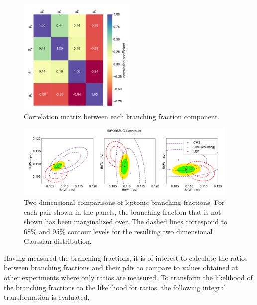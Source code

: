 \begin{figure}[htb!]
    \begin{center}
    \includegraphics[width=0.5\textwidth]{chapters/Analysis/sectionResult/figures/correlation_matrix_POI_unblinded.pdf}
    \caption{Correlation matrix between each branching fraction component.}
    \label{fig:correlation_matrix_POI}
    \end{center}
\end{figure}

\begin{figure}
    \begin{center}
    \includegraphics[width=0.95\textwidth]{chapters/Analysis/sectionResult/figures/result_contours_2d.pdf}
    \caption{Two dimensional comparisons of leptonic branching
    fractions.  For each pair shown in the panels, the branching
    fraction that is not shown has been marginalized over.  The dashed
    lines correspond to 68\% and 95\% contour levels for the resulting two
    dimensional Gaussian distribution.}
    \label{fig:contours_2D}
    \end{center}
\end{figure}



Having measured the branching fractions, it is of interest to calculate the
ratios between branching fractions and their pdfs to compare to values obtained
at other experiments where only ratios are measured.  To transform the
likelihood of the branching fractions to the likelihood for ratios, the following
integral transformation is evaluated\cite{10.2307/2334671},

